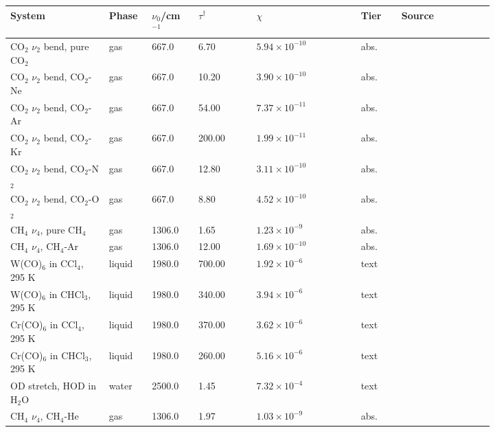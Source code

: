 \begin{table}[htbp]
\centering
\noindent\footnotesize\setlength{\tabcolsep}{3pt}\begin{tabular}{@{}p{0.17\linewidth}p{0.05\linewidth}p{0.08\linewidth}p{0.10\linewidth}p{0.185\linewidth}p{0.075\linewidth}p{0.16\linewidth}@{}}
\toprule
System & Phase & \(\nu_0\)/cm\(^{-1}\) & \(\tau\)\(^{\dagger}\) & \(\chi\) & Tier & Source \\
\midrule
CO$_2$ \(\nu_2\) bend, pure CO$_2$ & gas & 667.0 & 6.70 & \(5.94\!\times\!10^{-10}\) & abs. & \citep{cannemeijer1973} \\
CO$_2$ \(\nu_2\) bend, CO$_2$-Ne & gas & 667.0 & 10.20 & \(3.90\!\times\!10^{-10}\) & abs. & \citep{cannemeijer1973} \\
CO$_2$ \(\nu_2\) bend, CO$_2$-Ar & gas & 667.0 & 54.00 & \(7.37\!\times\!10^{-11}\) & abs. & \citep{cannemeijer1973} \\
CO$_2$ \(\nu_2\) bend, CO$_2$-Kr & gas & 667.0 & 200.00 & \(1.99\!\times\!10^{-11}\) & abs. & \citep{cannemeijer1973} \\
CO$_2$ \(\nu_2\) bend, CO$_2$-N$_2$ & gas & 667.0 & 12.80 & \(3.11\!\times\!10^{-10}\) & abs. & \citep{cannemeijer1974} \\
CO$_2$ \(\nu_2\) bend, CO$_2$-O$_2$ & gas & 667.0 & 8.80 & \(4.52\!\times\!10^{-10}\) & abs. & \citep{cannemeijer1974} \\
CH$_4$ \(\nu_4\), pure CH$_4$ & gas & 1306.0 & 1.65 & \(1.23\!\times\!10^{-9}\) & abs. & \citep{ch4vt} \\
CH$_4$ \(\nu_4\), CH$_4$-Ar & gas & 1306.0 & 12.00 & \(1.69\!\times\!10^{-10}\) & abs. & \citep{ch4vt} \\
W(CO)$_6$ in CCl$_4$, 295 K & liquid & 1980.0 & 700.00 & \(1.92\!\times\!10^{-6}\) & text & \citep{tokmakoff1994} \\
W(CO)$_6$ in CHCl$_3$, 295 K & liquid & 1980.0 & 340.00 & \(3.94\!\times\!10^{-6}\) & text & \citep{tokmakoff1994} \\
Cr(CO)$_6$ in CCl$_4$, 295 K & liquid & 1980.0 & 370.00 & \(3.62\!\times\!10^{-6}\) & text & \citep{tokmakoff1994} \\
Cr(CO)$_6$ in CHCl$_3$, 295 K & liquid & 1980.0 & 260.00 & \(5.16\!\times\!10^{-6}\) & text & \citep{tokmakoff1994} \\
OD stretch, HOD in H$_2$O & water & 2500.0 & 1.45 & \(7.32\!\times\!10^{-4}\) & text & \citep{steinel2004} \\
CH$_4$ \(\nu_4\), CH$_4$-He & gas & 1306.0 & 1.97 & \(1.03\!\times\!10^{-9}\) & abs. & \citep{ch4vt} \\

\end{tabular}
\end{table}

